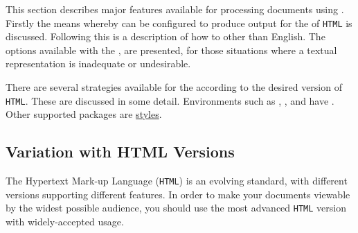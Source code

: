 \startdocument
%
\label{sec:fea}%
\html{\\}\noindent
This {section} describes major features available for processing
documents using \latextohtml.
Firstly the means whereby \latextohtml{} can be configured to produce output 
for the  of \texttt{HTML} 
is discussed.
Following this is a description
of how to  other than English. 
The options available with the ,
are presented,
for those situations where a textual representation is inadequate or undesirable.

There are several strategies available for the  according to the desired version of \texttt{HTML}. 
These are discussed in some detail. 
Environments such as , , 
and  have %
. 
Other supported packages are \hyperref{listed}{listed in Table~}{}{styles}.


\subsection{Variation with HTML Versions\label{versions}}%
%
%
%
%
\html{\\}\noindent
The Hypertext Mark-up Language (\texttt{HTML}) is an evolving standard,
with different versions supporting different features.  
In order to make your documents viewable by the widest possible audience,
you should use the most advanced \texttt{HTML} version with widely-accepted usage.

